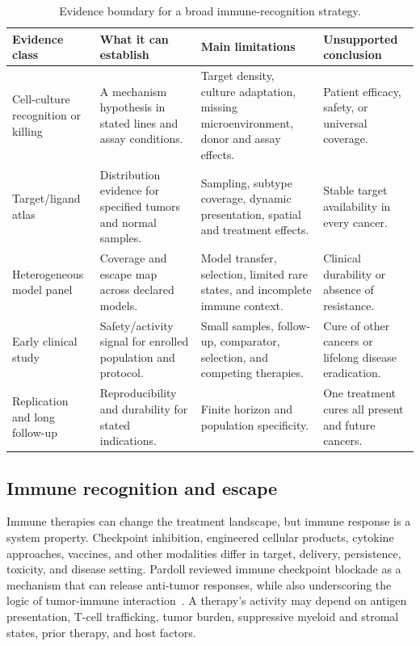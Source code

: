 \documentclass[10pt,conference]{IEEEtran}
\begin{document}
\begin{table}[!t]\caption{Evidence boundary for a broad immune-recognition strategy.}\label{tab:boundary}\centering\footnotesize
\begin{tabular}{@{}p{}p{}p{}p{}@{}}\toprule
Evidence class & What it can establish & Main limitations & Unsupported conclusion\\\midrule
Cell-culture recognition or killing & A mechanism hypothesis in stated lines and assay conditions. & Target density, culture adaptation, missing microenvironment, donor and assay effects. & Patient efficacy, safety, or universal coverage.\\
Target/ligand atlas & Distribution evidence for specified tumors and normal samples. & Sampling, subtype coverage, dynamic presentation, spatial and treatment effects. & Stable target availability in every cancer.\\
Heterogeneous model panel & Coverage and escape map across declared models. & Model transfer, selection, limited rare states, and incomplete immune context. & Clinical durability or absence of resistance.\\
Early clinical study & Safety/activity signal for enrolled population and protocol. & Small samples, follow-up, comparator, selection, and competing therapies. & Cure of other cancers or lifelong disease eradication.\\
Replication and long follow-up & Reproducibility and durability for stated indications. & Finite horizon and population specificity. & One treatment cures all present and future cancers.\\\bottomrule\end{tabular}\end{table}

\subsection{Immune recognition and escape}
Immune therapies can change the treatment landscape, but immune response is a system property. Checkpoint inhibition, engineered cellular products, cytokine approaches, vaccines, and other modalities differ in target, delivery, persistence, toxicity, and disease setting. Pardoll reviewed immune checkpoint blockade as a mechanism that can release anti-tumor responses, while also underscoring the logic of tumor-immune interaction~\cite{pardoll2012}. A therapy's activity may depend on antigen presentation, T-cell trafficking, tumor burden, suppressive myeloid and stromal states, prior therapy, and host factors.
\end{document}
